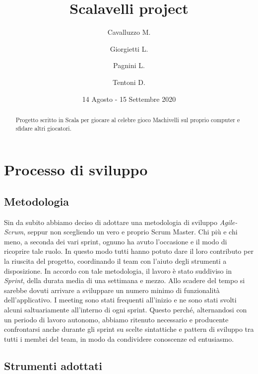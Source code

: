 \documentclass{article}
\title{Scalavelli project}
\date{14 Agosto - 15 Settembre 2020}
\author{
Cavalluzzo M.
\and
Giorgietti L.
\and
Pagnini L.
\and
Tentoni D.
}
\begin{document}
    \maketitle
    \newpage

    \begin{abstract}
        Progetto scritto in Scala per giocare al celebre gioco Machivelli sul proprio computer e sfidare altri giocatori.
    \end{abstract}

    \tableofcontents

    \newpage


    \section{Processo di sviluppo}\label{sec:processo-di-sviluppo}

    \subsection{Metodologia}
    Sin da subito abbiamo deciso di adottare una metodologia di sviluppo \textit{Agile-Scrum}, seppur non scegliendo un vero e proprio Scrum Master.
    Chi più e chi meno, a seconda dei vari sprint, ognuno ha avuto l'occasione e il modo di ricoprire tale ruolo.
    In questo modo tutti hanno potuto dare il loro contributo per la riuscita del progetto, coordinando il team con l'aiuto degli strumenti a disposizione.
    In accordo con tale metodologia, il lavoro è stato suddiviso in \textit{Sprint}, della durata media di una settimana e mezzo.
    Allo scadere del tempo si sarebbe dovuti arrivare a sviluppare un numero minimo di funzionalità dell'applicativo.
    I meeting sono stati frequenti all'inizio e ne sono stati svolti alcuni saltuariamente all'interno di ogni sprint.
    Questo perché, alternandosi con un periodo di lavoro autonomo, abbiamo ritenuto necessario e producente confrontarsi anche durante gli sprint su scelte sintattiche e pattern di sviluppo tra tutti i membri del team, in modo da condividere conoscenze ed entusiasmo.

    \subsection{Strumenti adottati}
\end{document}
